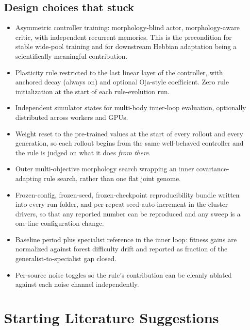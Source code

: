 \documentclass[letterpaper,10pt]{article}
\begin{document}
\subsection{Design choices that stuck}
\begin{itemize}
    \item Asymmetric controller training: morphology-blind actor, morphology-aware critic, with independent recurrent memories. This is the precondition for stable wide-pool training and for downstream Hebbian adaptation being a scientifically meaningful contribution.
    \item Plasticity rule restricted to the last linear layer of the controller, with anchored decay (always on) and optional Oja-style coefficient. Zero rule initialization at the start of each rule-evolution run.
    \item Independent simulator states for multi-body inner-loop evaluation, optionally distributed across workers and GPUs.
    \item Weight reset to the pre-trained values at the start of every rollout and every generation, so each rollout begins from the same well-behaved controller and the rule is judged on what it does \emph{from there}.
    \item Outer multi-objective morphology search wrapping an inner covariance-adapting rule search, rather than one flat joint genome.
    \item Frozen-config, frozen-seed, frozen-checkpoint reproducibility bundle written into every run folder, and per-repeat seed auto-increment in the cluster drivers, so that any reported number can be reproduced and any sweep is a one-line configuration change.
    \item Baseline period plus specialist reference in the inner loop: fitness gains are normalized against forest difficulty drift and reported as fraction of the generalist-to-specialist gap closed.
    \item Per-source noise toggles so the rule's contribution can be cleanly ablated against each noise channel independently.
\end{itemize}
    
\section{Starting Literature Suggestions}
\end{document}

